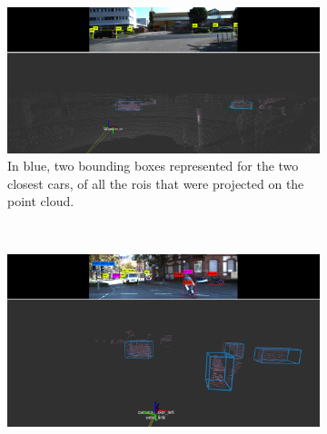 \begin{figure}[H]
	\centering
	\begin{subfigure}[c]{0.8\textwidth}
		\centering
		\includegraphics[width=\textwidth]{img/image-object-to-point-cloud/bboxes-side-view.png}
		\caption{In blue, two bounding boxes represented for the two closest cars, of all the \acsp{roi} that were projected on the point cloud.}
		\label{fig:bboxes-3d-kitti-side}
	\end{subfigure}
	\\ \vspace{4mm}
	\begin{subfigure}[c]{0.8\textwidth}
		\centering	
		\includegraphics[width=\textwidth]{img/image-object-to-point-cloud/bboxes-front-view.png}

\end{subfigure}
\end{figure}
